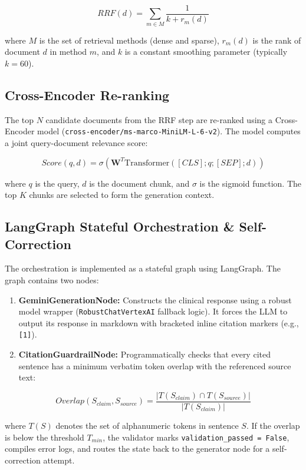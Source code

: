 \documentclass[sn-mathphys,Numbered]{sn-jnl}%
\begin{document}
\begin{equation}
RRF(d) = \sum_{m \in M} \frac{1}{k + r_m(d)}
\end{equation}

where $M$ is the set of retrieval methods (dense and sparse), $r_m(d)$ is the rank of document $d$ in method $m$, and $k$ is a constant smoothing parameter (typically $k=60$).

\subsection{Cross-Encoder Re-ranking}
The top $N$ candidate documents from the RRF step are re-ranked using a Cross-Encoder model (\texttt{cross-encoder/ms-marco-MiniLM-L-6-v2}). The model computes a joint query-document relevance score:

\begin{equation}
Score(q, d) = \sigma(\mathbf{W}^T \text{Transformer}([CLS]; q; [SEP]; d))
\end{equation}

where $q$ is the query, $d$ is the document chunk, and $\sigma$ is the sigmoid function. The top $K$ chunks are selected to form the generation context.

\subsection{LangGraph Stateful Orchestration \& Self-Correction}
The orchestration is implemented as a stateful graph using LangGraph. The graph contains two nodes:
\begin{enumerate}
    \item \textbf{GeminiGenerationNode:} Constructs the clinical response using a robust model wrapper (\texttt{RobustChatVertexAI} fallback logic). It forces the LLM to output its response in markdown with bracketed inline citation markers (e.g., \texttt{[1]}).
    \item \textbf{CitationGuardrailNode:} Programmatically checks that every cited sentence has a minimum verbatim token overlap with the referenced source text:
\end{enumerate}

\begin{equation}
Overlap(S_{claim}, S_{source}) = \frac{|T(S_{claim}) \cap T(S_{source})|}{|T(S_{claim})|}
\end{equation}

where $T(S)$ denotes the set of alphanumeric tokens in sentence $S$. If the overlap is below the threshold $T_{min}$, the validator marks \texttt{validation\_passed = False}, compiles error logs, and routes the state back to the generator node for a self-correction attempt.
\end{document}

